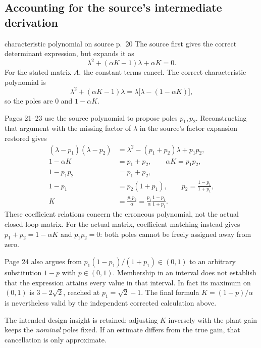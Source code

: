 \documentclass[11pt,a4paper]{article}
\numberwithin{equation}{section}
\numberwithin{figure}{section}
\numberwithin{table}{section}
\begin{document}
\subsection{Accounting for the source's intermediate derivation}\label{sec:sourcepoles}
\begin{sourcecorrection}{characteristic polynomial on source p.\ 20}
The source first gives the correct determinant expression, but expands it as
\[\lambda^2+(\alpha K-1)\lambda+\alpha K=0.\]
For the stated matrix $A$, the constant terms cancel. The correct characteristic polynomial is
\[\lambda^2+(\alpha K-1)\lambda=\lambda\bigl[\lambda-(1-\alpha K)\bigr],\]
so the poles are $0$ and $1-\alpha K$.
\end{sourcecorrection}
Pages 21--23 use the source polynomial to propose poles $p_1,p_2$. Reconstructing that argument with the missing factor of $\lambda$ in the source's factor expansion restored gives
\begin{align*}
(\lambda-p_1)(\lambda-p_2)&=\lambda^2-(p_1+p_2)\lambda+p_1p_2,\\
1-\alpha K&=p_1+p_2,\qquad \alpha K=p_1p_2,\\
1-p_1p_2&=p_1+p_2,\\
1-p_1&=p_2(1+p_1),\qquad p_2=\frac{1-p_1}{1+p_1},\\
K&=\frac{p_1p_2}{\alpha}=\frac{p_1}{\alpha}\frac{1-p_1}{1+p_1}.
\end{align*}
These coefficient relations concern the erroneous polynomial, not the actual closed-loop matrix. For the actual matrix, coefficient matching instead gives $p_1+p_2=1-\alpha K$ and $p_1p_2=0$: both poles cannot be freely assigned away from zero.

Page 24 also argues from $p_1(1-p_1)/(1+p_1)\in(0,1)$ to an arbitrary substitution $1-p$ with $p\in(0,1)$. Membership in an interval does not establish that the expression attains every value in that interval. In fact its maximum on $(0,1)$ is $3-2\sqrt2$, reached at $p_1=\sqrt2-1$. The final formula $K=(1-p)/\alpha$ is nevertheless valid by the independent corrected calculation above.

The intended design insight is retained: adjusting $K$ inversely with the plant gain keeps the \emph{nominal} poles fixed. If an estimate differs from the true gain, that cancellation is only approximate.
\end{document}
